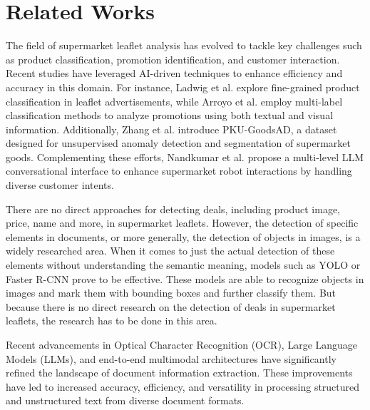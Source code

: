 \documentclass[11pt]{article}
\begin{document}
\section{Related Works}
The field of supermarket leaflet analysis has evolved to tackle key challenges such as product classification, promotion identification, and customer interaction. Recent studies have leveraged AI-driven techniques to enhance efficiency and accuracy in this domain. For instance, Ladwig et al. \cite{ladwig2023} explore fine-grained product classification in leaflet advertisements, while Arroyo et al. \cite{arroyo2020} employ multi-label classification methods to analyze promotions using both textual and visual information. Additionally, Zhang et al. \cite{zhang2024} introduce PKU-GoodsAD, a dataset designed for unsupervised anomaly detection and segmentation of supermarket goods. Complementing these efforts, Nandkumar et al. \cite{nandkumar2024} propose a multi-level LLM conversational interface to enhance supermarket robot interactions by handling diverse customer intents.

There are no direct approaches for detecting deals, including product image, price, name and more, in supermarket leaflets. However, the detection of specific elements in documents, or more generally, the detection of objects in images, is a widely researched area. When it comes to just the actual detection of these elements without understanding the semantic meaning, models such as YOLO or Faster R-CNN prove to be effective. These models are able to recognize objects in images and mark them with bounding boxes and further classify them. But because there is no direct research on the detection of deals in supermarket leaflets, the research has to be done in this area.

Recent advancements in Optical Character Recognition (OCR), Large Language Models (LLMs), and end-to-end multimodal architectures have significantly refined the landscape of document information extraction. These improvements have led to increased accuracy, efficiency, and versatility in processing structured and unstructured text from diverse document formats.
\end{document}
